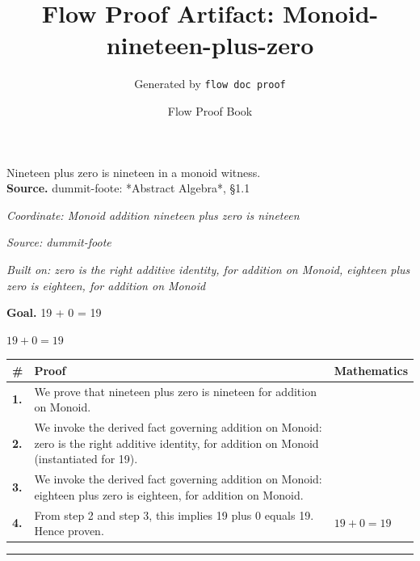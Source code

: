 \documentclass[11pt]{article}
\title{Flow Proof Artifact: Monoid-nineteen-plus-zero}
\author{Generated by \texttt{flow doc proof}}
\date{Flow Proof Book}
\theoremstyle{definition}
\begin{document}
\maketitle
Nineteen plus zero is nineteen in a monoid witness.\\[0.5em]
\textbf{Source.} dummit-foote: *Abstract Algebra*, §1.1\\[0.5em]
\bigskip
{}\par
\smallskip\noindent\textit{Coordinate: Monoid \cdot addition \cdot nineteen plus zero is nineteen}\par
\smallskip\noindent\textit{Source: dummit-foote}\par
\smallskip\noindent\textit{Built on: zero is the right additive identity, for addition on Monoid, eighteen plus zero is eighteen, for addition on Monoid}\par
\medskip
\noindent\textbf{Goal.} 19 + 0 = 19\par
\noindent$\displaystyle 19 + 0 = 19$\par
\medskip
\noindent
\begin{tabular}{@{} >{\raggedright\arraybackslash}p{} >{\raggedright\arraybackslash}p{} >{\raggedleft\arraybackslash}p{} @{}}
\textbf{\#} & \textbf{Proof} & \textbf{Mathematics} \\
\midrule
\textbf{1.} & We prove that nineteen plus zero is nineteen for addition on Monoid. & \\[0.45em]
\textbf{2.} & We invoke the derived fact governing addition on Monoid: zero is the right additive identity, for addition on Monoid (instantiated for 19). & \\[0.45em]
\textbf{3.} & We invoke the derived fact governing addition on Monoid: eighteen plus zero is eighteen, for addition on Monoid. & \\[0.45em]
\textbf{4.} & From step 2 and step 3, this implies 19 plus 0 equals 19. Hence proven. & $\displaystyle 19 + 0 = 19$ \\[0.45em]
\bottomrule
\end{tabular}
\label{thm:Monoid-addition-nineteen_plus_zero_is_nineteen}
\par\medskip\hrule
\end{document}
